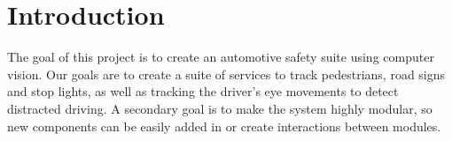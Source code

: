 \section{Introduction}

The goal of this project is to create an automotive safety suite using computer vision.
Our goals are to create a suite of services to track pedestrians, road signs and stop lights, as well as tracking the driver's eye movements to detect distracted driving.
A secondary goal is to make the system highly modular, so new components can be easily added in or create interactions between modules.

